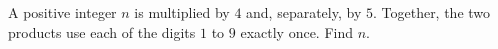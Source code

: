 A positive integer $n$ is multiplied by $4$ and, separately, by $5$. Together, the two products use each of the digits $1$ to $9$ exactly once. Find $n$.
